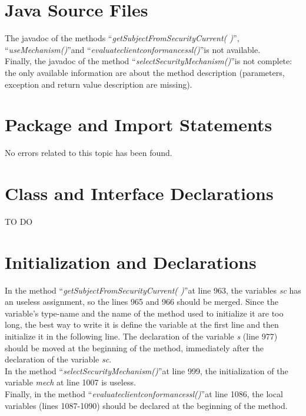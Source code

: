 \documentclass[\mainpath/main]{subfiles}
\begin{document}
\section{Java Source Files}
\label{CodeInspectionChecklist:JaveSourceFiles}
The javadoc of the methods \textquotedblleft \textit{getSubjectFromSecurityCurrent( )}\textquotedblright , \textquotedblleft \textit{useMechanism(\textellipsis)}\textquotedblright  and \textquotedblleft \textit{evaluate\textunderscore client\textunderscore conformance\textunderscore ssl(\textellipsis)}\textquotedblright is not available.\\
Finally, the javadoc of the method \textquotedblleft \textit{selectSecurityMechanism(\textellipsis)}\textquotedblright  is not complete: the only available information are about the method description (parameters, exception and return value description are missing).

\section{Package and Import Statements}
\label{CodeInspectionChecklist:PackageandImportStatements}
No errors related to this topic has been found.

\section{Class and Interface Declarations}
\label{CodeInspectionChecklist:ClassandInterfaceDeclarations}
TO DO

\section{Initialization and Declarations}
\label{CodeInspectionChecklist:InitializationandDeclarations}
In the method \textquotedblleft \textit{getSubjectFromSecurityCurrent( )}\textquotedblright at line 963, the variables \textit{sc} has an useless assignment, so the lines 965 and 966 should be merged. Since the variable's type-name and the name of the method used to initialize it are too long, the best way to write it is define the variable at the first line and then initialize it in the following line.
The declaration of the variable \textit{s} (line 977) should be moved at the beginning of the method, immediately after the declaration of the variable \textit{sc}.\\
In the method \textquotedblleft \textit{selectSecurityMechanism(\textellipsis)}\textquotedblright at line 999, the initialization of the variable \textit{mech} at line 1007 is useless.\\
Finally, in the method \textquotedblleft \textit{evaluate\textunderscore client\textunderscore conformance\textunderscore ssl(\textellipsis)}\textquotedblright  at line 1086, the local variables (lines 1087-1090) should be declared at the beginning of the method.
\end{document}
